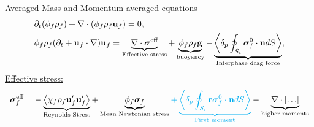 \documentclass{sintefbeamer}
\begin{document}
\begin{frame}{Averaged \underline{Mass} and \underline{Momentum} averaged equations }
  \begin{align*}
    &\partial_t (\phi_f \rho_f)  
    + \mathbf{\nabla}\cdot (
        \phi_f \rho_f\textbf{u}_f
    )
    = 
    0,\\
    &
    \phi_f \rho_f (\partial_t + \textbf{u}_f\cdot \mathbf{\nabla})\textbf{u}_f
    = 
    \underbrace{\mathbf{\nabla}\cdot \bm\sigma^\text{eff}}_\text{Effective stress}
    + \underbrace{\phi_f \rho_f \textbf{g} }_\text{buoyancy}
    - \underbrace{\left<\delta_p \oint_{S_{i}} {\bm{\sigma}_f^0 \cdot \textbf{n}} dS\right>}_\text{Interphase drag force},
  \end{align*}
  \underline{Effective stress: } 
  \begin{equation*}
    \bm{\sigma}_f^\text{eff}
    =
    - \underbrace{\avg{\chi_f\rho_f\textbf{u}_f'\textbf{u}_f'}}_\text{Reynolds Stress}
    + \underbrace{\phi_f \bm{\sigma}_f}_\text{Mean Newtonian stress}%
    \textcolor{cyan}{ + \underbrace{ {\pSavg{{\textbf{r}\bm{\sigma}_f^0 \cdot \textbf{n}}}}}_\text{First moment}}
     -\underbrace{\div [\ldots]}_\text{higher moments}
  \end{equation*}
\end{frame}
\end{document}
